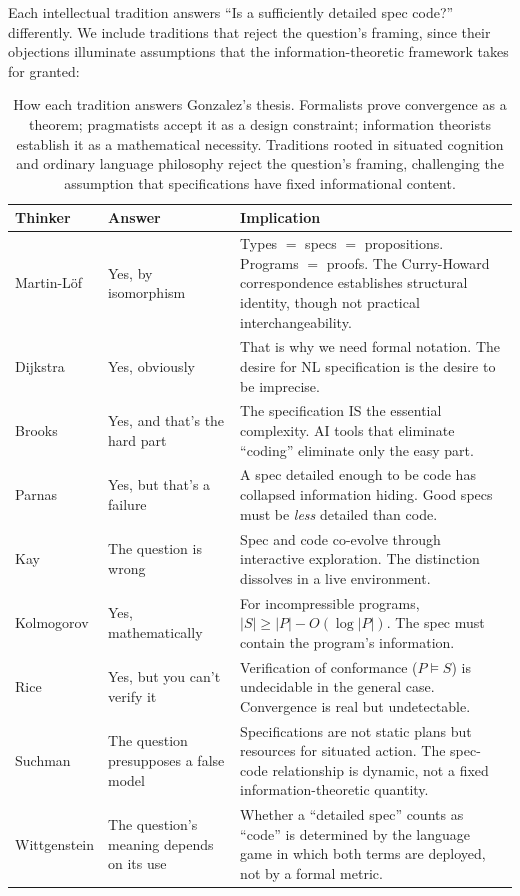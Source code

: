 \documentclass[11pt, a4paper, copyright]{googledeepmind}
\begin{document}
Each intellectual tradition answers ``Is a sufficiently detailed spec code?'' differently. We include traditions that reject the question's framing, since their objections illuminate assumptions that the information-theoretic framework takes for granted:

\begin{table}[H]
\centering
\small
\begin{tabular}{llp{7.5cm}}
\toprule
\textbf{Thinker} & \textbf{Answer} & \textbf{Implication} \\
\midrule
Martin-L\"{o}f & Yes, by isomorphism & Types $=$ specs $=$ propositions. Programs $=$ proofs. The Curry-Howard correspondence establishes structural identity, though not practical interchangeability. \\
Dijkstra & Yes, obviously & That is why we need formal notation. The desire for NL specification is the desire to be imprecise. \\
Brooks & Yes, and that's the hard part & The specification IS the essential complexity. AI tools that eliminate ``coding'' eliminate only the easy part. \\
Parnas & Yes, but that's a failure & A spec detailed enough to be code has collapsed information hiding. Good specs must be \emph{less} detailed than code. \\
Kay & The question is wrong & Spec and code co-evolve through interactive exploration. The distinction dissolves in a live environment. \\
Kolmogorov & Yes, mathematically & For incompressible programs, $|S| \geq |P| - O(\log |P|)$. The spec must contain the program's information. \\
Rice & Yes, but you can't verify it & Verification of conformance ($P \models S$) is undecidable in the general case. Convergence is real but undetectable. \\
Suchman & The question presupposes a false model & Specifications are not static plans but resources for situated action. The spec-code relationship is dynamic, not a fixed information-theoretic quantity. \\
Wittgenstein & The question's meaning depends on its use & Whether a ``detailed spec'' counts as ``code'' is determined by the language game in which both terms are deployed, not by a formal metric. \\
\bottomrule
\end{tabular}
\caption{How each tradition answers Gonzalez's thesis. Formalists prove convergence as a theorem; pragmatists accept it as a design constraint; information theorists establish it as a mathematical necessity. Traditions rooted in situated cognition and ordinary language philosophy reject the question's framing, challenging the assumption that specifications have fixed informational content.}
\label{tab:seven-answers}
\end{table}
\end{document}
